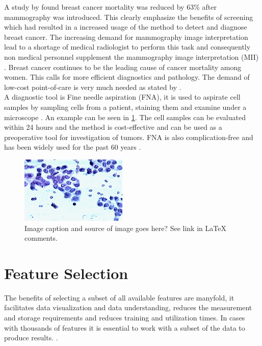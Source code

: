 \documentclass{kththesis}
\begin{document}
A study by \textcite{tabar2001} found breast cancer mortality was reduced by 63\% after mammography was introduced. This clearly emphasize the benefits of screening which had resulted in a increased usage of the method to detect and diagnose breast cancer. The increasing demand for mammography image interpretation lead to a shortage of medical radiologist to perform this task and consequently non medical personnel supplement the mammography image interpretation (MII) \parencite{culpan2016}. Breast cancer continues to be the leading cause of cancer mortality among women. This calls for more efficient diagnostics and pathology. The demand of low-cost point-of-care is very much needed as stated by \textcite{martei2018}.\\

A diagnostic tool is Fine needle aspiration (FNA), it is used to aspirate cell samples by sampling cells from a patient, staining them and examine under a microscope \parencite{FNA}. An example can be seen in \ref{fig:fna_nuclei}. The cell samples can be evaluated within 24 hours and the method is cost-effective and can be used as a preoperative tool for investigation of tumors. FNA is also complication-free and has been widely used for the past 60 years \parencite{FNA}.

\begin{figure}[ht!]
  \centering
  \includegraphics[]{images/fna_nuclei.png}
  \caption{Image caption and source of image goes here? See link in LaTeX comments.}
  \label{fig:fna_nuclei}
\end{figure}


\section{Feature Selection}

The benefits of selecting a subset of all available features are manyfold, it facilitates data visualization and data understanding, reduces the measurement and storage requirements and reduces training and utilization times. In cases with thousands of features it is essential to work with a subset of the data to produce results. \parencite{guyon2003}.
\end{document}
